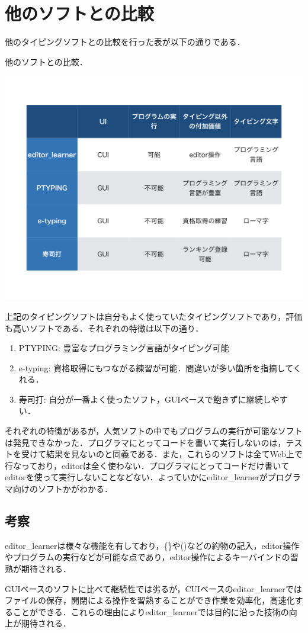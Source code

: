 \chapter{他のソフトとの比較}\label{ux4ed6ux306eux30bdux30d5ux30c8ux3068ux306eux6bd4ux8f03}

    他のタイピングソフトとの比較を行った表が以下の通りである．

\begin{table}[H]
\centering
\begin{center}
\caption{他のソフトとの比較．\label{compare}}
\includegraphics[width=150mm]{../../picture/compare.jpeg}
\end{center}

\label{fig:}
\end{table}

上記のタイピングソフトは自分もよく使っていたタイピングソフトであり，評価も高いソフトである．それぞれの特徴は以下の通り．

\begin{enumerate}
\def\labelenumi{\arabic{enumi}.}
\tightlist
\item
PTYPING: 豊富なプログラミング言語がタイピング可能
\item
e-typing: 資格取得にもつながる練習が可能．間違いが多い箇所を指摘してくれる．
\item
寿司打: 自分が一番よく使ったソフト，GUIベースで飽きずに継続しやすい．
\end{enumerate}

それぞれの特徴があるが，人気ソフトの中でもプログラムの実行が可能なソフトは発見できなかった．プログラマにとってコードを書いて実行しないのは，テストを受けて結果を見ないのと同義である．また，これらのソフトは全てWeb上で行なっており，editorは全く使わない．プログラマにとってコードだけ書いてeditorを使って実行しないことなどない．よっていかにeditor\_learnerがプログラマ向けのソフトかがわかる．

\section{考察}\label{ux8003ux5bdf}

editor\_learnerは様々な機能を有しており，\{\}や()などの約物の記入，editor操作やプログラムの実行などが可能な点であり，editor操作によるキーバインドの習熟が期待される．

GUIベースのソフトに比べて継続性では劣るが，CUIベースのeditor\_learnerではファイルの保存，開閉による操作を習熟することができ作業を効率化，高速化することができる．これらの理由によりeditor\_learnerでは目的に沿った技術の向上が期待される．

    